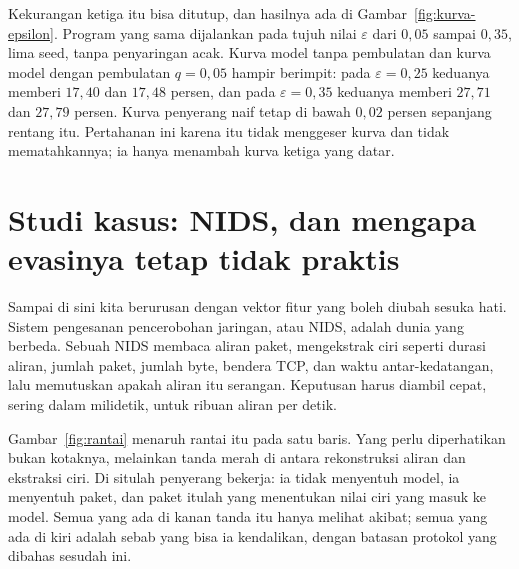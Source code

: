 Kekurangan ketiga itu bisa ditutup, dan hasilnya ada di Gambar~\ref{fig:kurva-epsilon}.
Program yang sama dijalankan pada tujuh nilai $\varepsilon$ dari $0{,}05$ sampai
$0{,}35$, lima seed, tanpa penyaringan acak. Kurva model tanpa pembulatan dan kurva
model dengan pembulatan $q=0{,}05$ hampir berimpit: pada $\varepsilon=0{,}25$ keduanya
memberi $17{,}40$ dan $17{,}48$ persen, dan pada $\varepsilon=0{,}35$ keduanya memberi
$27{,}71$ dan $27{,}79$ persen. Kurva penyerang naif tetap di bawah $0{,}02$ persen
sepanjang rentang itu. Pertahanan ini karena itu tidak menggeser kurva dan tidak
mematahkannya; ia hanya menambah kurva ketiga yang datar.


\section{Studi kasus: NIDS, dan mengapa evasinya tetap tidak praktis}

Sampai di sini kita berurusan dengan vektor fitur yang boleh diubah sesuka hati. Sistem
pengesanan pencerobohan jaringan, atau NIDS, adalah dunia yang berbeda.
Sebuah NIDS membaca aliran paket, mengekstrak ciri seperti durasi aliran,
jumlah paket, jumlah byte, bendera TCP, dan waktu antar-kedatangan, lalu memutuskan
apakah aliran itu serangan. Keputusan harus diambil cepat, sering dalam milidetik, untuk
ribuan aliran per detik.

Gambar~\ref{fig:rantai} menaruh rantai itu pada satu baris. Yang perlu diperhatikan
bukan kotaknya, melainkan tanda merah di antara rekonstruksi aliran dan ekstraksi ciri.
Di situlah penyerang bekerja: ia tidak menyentuh model, ia menyentuh paket, dan paket
itulah yang menentukan nilai ciri yang masuk ke model. Semua yang ada di kanan tanda itu
hanya melihat akibat; semua yang ada di kiri adalah sebab yang bisa ia kendalikan, dengan
batasan protokol yang dibahas sesudah ini.

